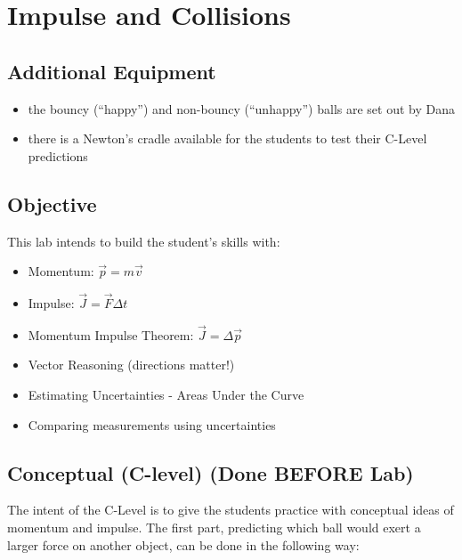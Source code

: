\documentclass[fleqn,letterpaper]{article}
\begin{document}
\cfoot{}
\headsep=25pt

\section*{Impulse and Collisions}

\subsection*{Additional Equipment}

\begin{itemize}
  \item{the bouncy (``happy'') and non-bouncy (``unhappy'') balls are set out by Dana}
  \item{there is a Newton's cradle available for the students to test their C-Level predictions}
\end{itemize}

\subsection*{Objective}

This lab intends to build the student's skills with:
%
\begin{itemize}
 \item{Momentum:  $\vec{p} = m\vec{v}$}
 \item{Impulse:  $\vec{J} = \vec{F} \Delta t$}
 \item{Momentum Impulse Theorem:  $\vec{J} = \Delta \vec{p}$ }
 \item{Vector Reasoning (directions matter!)}
 \item{Estimating Uncertainties - Areas Under the Curve}
 \item{Comparing measurements using uncertainties}
\end{itemize}
%

\subsection*{Conceptual (C-level) (Done BEFORE Lab)}

The intent of the C-Level is to give the students practice with conceptual ideas of momentum and impulse.  The first part, predicting which ball would exert a larger force on another object, can be done in the following way:
\end{document}
